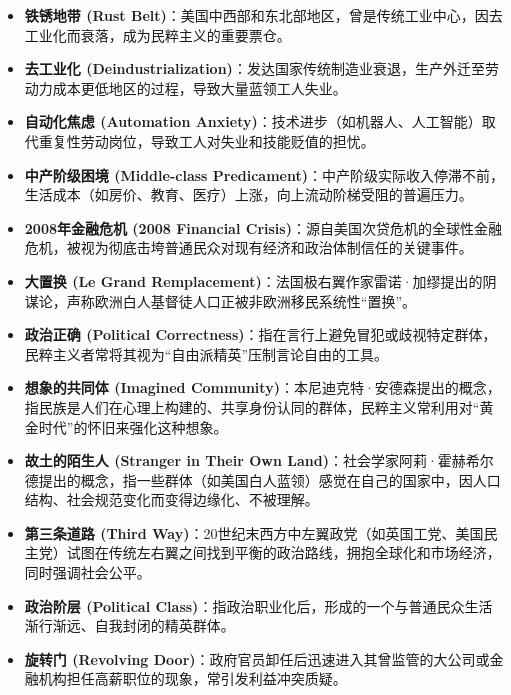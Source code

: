 \begin{itemize}
    \item \textbf{铁锈地带 (Rust Belt)}：美国中西部和东北部地区，曾是传统工业中心，因去工业化而衰落，成为民粹主义的重要票仓。

    \item \textbf{去工业化 (Deindustrialization)}：发达国家传统制造业衰退，生产外迁至劳动力成本更低地区的过程，导致大量蓝领工人失业。

    \item \textbf{自动化焦虑 (Automation Anxiety)}：技术进步（如机器人、人工智能）取代重复性劳动岗位，导致工人对失业和技能贬值的担忧。

    \item \textbf{中产阶级困境 (Middle-class Predicament)}：中产阶级实际收入停滞不前，生活成本（如房价、教育、医疗）上涨，向上流动阶梯受阻的普遍压力。

    \item \textbf{2008年金融危机 (2008 Financial Crisis)}：源自美国次贷危机的全球性金融危机，被视为彻底击垮普通民众对现有经济和政治体制信任的关键事件。

    \item \textbf{大置换 (Le Grand Remplacement)}：法国极右翼作家雷诺·加缪提出的阴谋论，声称欧洲白人基督徒人口正被非欧洲移民系统性“置换”。

    \item \textbf{政治正确 (Political Correctness)}：指在言行上避免冒犯或歧视特定群体，民粹主义者常将其视为“自由派精英”压制言论自由的工具。

    \item \textbf{想象的共同体 (Imagined Community)}：本尼迪克特·安德森提出的概念，指民族是人们在心理上构建的、共享身份认同的群体，民粹主义常利用对“黄金时代”的怀旧来强化这种想象。

    \item \textbf{故土的陌生人 (Stranger in Their Own Land)}：社会学家阿莉·霍赫希尔德提出的概念，指一些群体（如美国白人蓝领）感觉在自己的国家中，因人口结构、社会规范变化而变得边缘化、不被理解。

    \item \textbf{第三条道路 (Third Way)}：20世纪末西方中左翼政党（如英国工党、美国民主党）试图在传统左右翼之间找到平衡的政治路线，拥抱全球化和市场经济，同时强调社会公平。

    \item \textbf{政治阶层 (Political Class)}：指政治职业化后，形成的一个与普通民众生活渐行渐远、自我封闭的精英群体。

    \item \textbf{旋转门 (Revolving Door)}：政府官员卸任后迅速进入其曾监管的大公司或金融机构担任高薪职位的现象，常引发利益冲突质疑。


\end{itemize}
